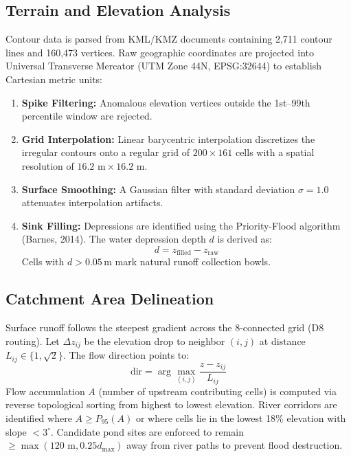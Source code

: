 \documentclass[manuscript,screen,review]{acmart}
\begin{document}
\subsection{Terrain and Elevation Analysis}
Contour data is parsed from KML/KMZ documents containing 2,711 contour lines and 160,473 vertices. Raw geographic coordinates are projected into Universal Transverse Mercator (UTM Zone 44N, EPSG:32644) to establish Cartesian metric units:
\begin{enumerate}
    \item \textbf{Spike Filtering:} Anomalous elevation vertices outside the 1st--99th percentile window are rejected.
    \item \textbf{Grid Interpolation:} Linear barycentric interpolation discretizes the irregular contours onto a regular grid of $200 \times 161$ cells with a spatial resolution of $16.2\text{ m} \times 16.2\text{ m}$.
    \item \textbf{Surface Smoothing:} A Gaussian filter with standard deviation $\sigma = 1.0$ attenuates interpolation artifacts.
    \item \textbf{Sink Filling:} Depressions are identified using the Priority-Flood algorithm (Barnes, 2014). The water depression depth $d$ is derived as:
    \begin{equation}
        d = z_{\text{filled}} - z_{\text{raw}}
    \end{equation}
    Cells with $d > 0.05$\,m mark natural runoff collection bowls.
\end{enumerate}

\subsection{Catchment Area Delineation}
Surface runoff follows the steepest gradient across the 8-connected grid (D8 routing). Let $\Delta z_{ij}$ be the elevation drop to neighbor $(i, j)$ at distance $L_{ij} \in \{1, \sqrt{2}\}$. The flow direction points to:
\begin{equation}
    \text{dir} = \arg\max_{(i,j)} \frac{z - z_{ij}}{L_{ij}}
\end{equation}
Flow accumulation $A$ (number of upstream contributing cells) is computed via reverse topological sorting from highest to lowest elevation. River corridors are identified where $A \ge P_{95}(A)$ or where cells lie in the lowest 18\% elevation with slope $<3^\circ$. Candidate pond sites are enforced to remain $\ge \max(120\text{ m}, 0.25 d_{\max})$ away from river paths to prevent flood destruction.
\end{document}
